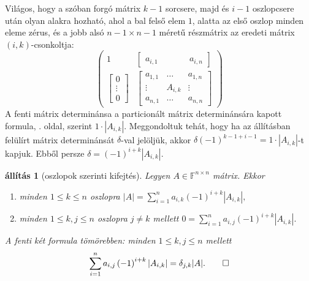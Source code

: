 \documentclass[9pt, a4paper, showtrims]{memoir}
\makeatletter
\renewenvironment{proof}[1][\proofname]
    {\par\pushQED{\qed}%
    \normalfont \topsep6\p@\@plus6\p@\relax
    \trivlist
    \item[\hskip\labelsep
        \itshape
    #1\@addpunct{:}]\ignorespaces}
    {\popQED\endtrivlist\@endpefalse}
\theoremstyle{plain}
\newtheorem{proposition}{állítás}[chapter]
\theoremstyle{remark}
\theoremstyle{definition}
\makeatother
\begin{document}
\begin{proof}
    Világos, hogy a szóban forgó mátrix $k-1$ sorcsere, majd
    és $i-1$ oszlopcsere után olyan alakra hozható,
    ahol a bal felső elem $1$, alatta az első oszlop minden eleme zérus,
    és a jobb alsó $n-1\times n-1$ méretű részmátrix az eredeti mátrix $\left( i,k \right)$-csonkoltja:
    \[
        \begin{pmatrix}
            1&  \begin{bmatrix}
                a_{i,1}\,&\phantom{A_{i,k}}&\,a_{i,n}
                \end{bmatrix}\\
            \begin{bmatrix}
                    0\\
                    \vdots\\
                    0
            \end{bmatrix}
                &
                \begin{bmatrix}
                    a_{1,1}&\dots&a_{1,n}\\
                    \vdots&A_{i,k}&\vdots\\
                    a_{n,1}&\dots&a_{n,n}
                \end{bmatrix}
        \end{pmatrix}
    \]
    A fenti mátrix determinánsa a particionált mátrix determinánsára kapott formula, 
    . oldal,
    szerint $1\cdot|A_{i,k}|$.
    Meggondoltuk tehát, hogy ha az állításban felülírt mátrix determinánsát $\delta$-val jelöljük,
    akkor  $\delta\left( -1 \right)^{k-1+i-1}=1\cdot|A_{i,k}|$-t kapjuk.
    Ebből persze
    \begin{math}
       \delta
       =\left( -1 \right)^{i+k}|A_{i,k}|.
    \end{math}
\end{proof}
\begin{proposition}[oszlopok szerinti kifejtés]
        Legyen $A\in\mathbb{F}^{n\times n}$ mátrix.
        Ekkor
        \begin{enumerate}
            \item minden $1\leq k\leq n$ oszlopra
                \(
                    |A|=
                    \sum_{i=1}^na_{i,k}\left( -1 \right)^{i+k}|A_{i,k}|,
                \)
            \item minden $1\leq k,j\leq n$ oszlopra $j\neq k$ mellett
                \(
                    0=
                    \sum_{i=1}^na_{i,j}\left( -1 \right)^{i+k}|A_{i,k}|.
                \)
        \end{enumerate}
A fenti két formula tömörebben: minden $1\leq k,j\leq n$ mellett
                \[
                    \sum_{i=1}^na_{i,j}\left( -1 \right)^{i+k}|A_{i,k}|
                    =
                    \delta_{j,k}|A|.\qedhere
                \]
\end{proposition}
\end{document}
